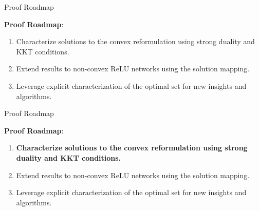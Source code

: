 \documentclass[usenames,dvipsnames,mathserif,notheorems]{beamer}
\newcommand{\bad}[1]{\textcolor{bad}{#1}}
\newcommand{\good}[1]{\textcolor{good}{#1}}
\begin{document}
\begin{frame}{Proof Roadmap}

	{
		\large
		{\Large
			\textbf{Proof Roadmap}:
		}
		\vspace{2em}
		\begin{enumerate}
			\large
			\item \pause
			      Characterize solutions to the \good{convex reformulation}
			      using strong duality and KKT conditions.
			      \vspace{1ex}
			      \pause
			\item Extend results to \bad{non-convex} ReLU networks
			      using the solution mapping.
			      \vspace{1ex}
			      \pause
			\item Leverage explicit characterization of the optimal
			      set for \good{new insights and algorithms}.
		\end{enumerate}
	}


\end{frame}

\begin{frame}{Proof Roadmap}

	{
		\large
		{\Large
			\textbf{Proof Roadmap}:
		}
		\vspace{2em}
		\begin{enumerate}
			\large
			\item \textbf{Characterize solutions to the \good{convex reformulation}
				      using strong duality and KKT conditions.}
			      \vspace{1ex}
			\item Extend results to \bad{non-convex} ReLU networks
			      using the solution mapping.
			      \vspace{1ex}
			\item Leverage explicit characterization of the optimal
			      set for \good{new insights and algorithms}.
		\end{enumerate}
	}

\end{frame}
\end{document}
